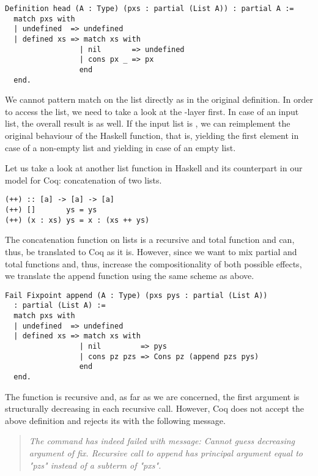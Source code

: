 \begin{verbatim}
Definition head (A : Type) (pxs : partial (List A)) : partial A :=
  match pxs with
  | undefined  => undefined
  | defined xs => match xs with
                 | nil       => undefined
                 | cons px _ => px
                 end
  end.
\end{verbatim}

We cannot pattern match on the list directly as in the original definition.
In order to access the list, we need to take a look at the -layer first.
In case of an  input list, the overall result is  as well.
If the input list is , we can reimplement the original behaviour of the Haskell function, that is, yielding the first element in case of a non-empty list and yielding  in case of an empty list.

Let us take a look at another list function in Haskell and its counterpart in our model for Coq: concatenation of two lists.

\begin{verbatim}
(++) :: [a] -> [a] -> [a]
(++) []       ys = ys
(++) (x : xs) ys = x : (xs ++ ys)
\end{verbatim}

The concatenation function on lists is a recursive and total function and can, thus, be translated to Coq as it is.
However, since we want to mix partial and total functions and, thus, increase the compositionality of both possible effects, we translate the append function using the same scheme as above.

\begin{verbatim}
Fail Fixpoint append (A : Type) (pxs pys : partial (List A))
  : partial (List A) :=
  match pxs with
  | undefined  => undefined
  | defined xs => match xs with
                 | nil         => pys
                 | cons pz pzs => Cons pz (append pzs pys)
                 end
  end.
\end{verbatim}

The function  is recursive and, as far as we are concerned, the first argument is structurally decreasing in each
recursive call.
However, Coq does not accept the above definition and rejects its with the following message.

\begin{quote}
\emph{The command has indeed failed with message: Cannot guess decreasing
argument of fix.
Recursive call to append has principal argument equal to "pzs" instead of a subterm of "pxs".}
\end{quote}

